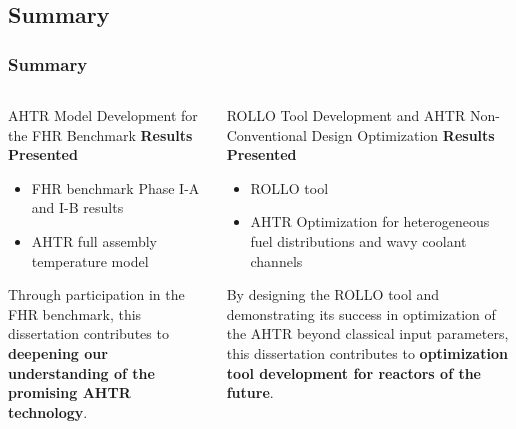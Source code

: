 \subsection*{Summary}
\begin{frame}
    \frametitle{Summary}
    
    \vspace{-0.2cm}
    \begin{columns}[t]
        \begin{column}{0.5\linewidth}
            \begin{block}{AHTR Model Development for the FHR Benchmark}
                \textbf{Results Presented} 
                \begin{itemize}
                    \item FHR benchmark Phase I-A and I-B results
                    \item AHTR full assembly temperature model 
                \end{itemize}

                Through participation in the FHR benchmark, this dissertation contributes to 
                \textbf{deepening our understanding of the promising \gls{AHTR} technology}.
            \end{block}
        \end{column}
        \begin{column}{0.5\linewidth}
            \begin{block}{ROLLO Tool Development and AHTR Non-Conventional Design Optimization}
                \textbf{Results Presented}
                \begin{itemize}
                    \item \acrfull{ROLLO} tool 
                    \item AHTR Optimization for heterogeneous fuel distributions and wavy 
                    coolant channels 
                \end{itemize}
                
                By designing the ROLLO tool and demonstrating its success in 
                optimization of the \gls{AHTR} beyond classical input parameters, this dissertation 
                contributes to \textbf{optimization tool development for reactors of the future}.
            \end{block}
        \end{column}
    \end{columns}
\end{frame}

